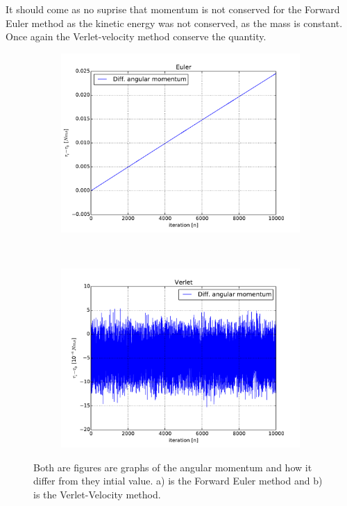  It should come as no suprise that momentum is not conserved for the Forward Euler method as the kinetic energy was not conserved, as the mass is constant. Once again the Verlet-velocity method conserve the quantity. 



\begin{figure}[H]
    \centering
    \begin{subfigure}{0.5\textwidth}
        \centering
        \includegraphics[width=\linewidth]{result/bilder/ang-momentum-euler.pdf}
        \caption{}
    \end{subfigure}%
    ~ 
    \begin{subfigure}{0.5\textwidth}
        \centering
        \includegraphics[width=\linewidth]{result/bilder/ang-momentum-verlet.pdf}
        \caption{}
    \end{subfigure}
    \caption{Both are figures are graphs of the angular momentum and how it differ from they intial value. a) is the Forward Euler method and b) is the Verlet-Velocity method. 
    }
    \label{fig:conserved-ang}
\end{figure}

